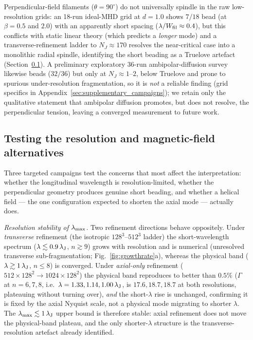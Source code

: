 \documentclass[usenatbib,twoside,twocolumn]{mnras}
\begin{document}
Perpendicular-field filaments ($\theta=90^\circ$) do not universally spindle in the raw low-resolution grids: an 18-run ideal-MHD grid at $d=1.0$ shows $7/18$ bead (at $\beta=0.5$ and $2.0$) with an apparently short spacing ($\lambda/W_{\rm fil}\approx0.4$), but this conflicts with static linear theory (which predicts a \emph{longer} mode) and a transverse-refinement ladder to $N_J\approx170$ resolves the near-critical case into a monolithic radial spindle, identifying the short beading as a Truelove artefact (Section~\ref{sec:optional_tests}). A preliminary exploratory 36-run ambipolar-diffusion survey likewise beads ($32/36$) but only at $N_J\approx1$--$2$, below Truelove and prone to spurious under-resolution fragmentation, so it is \emph{not} a reliable finding (grid specifics in Appendix~\ref{sec:supplementary_campaigns}); we retain only the qualitative statement that ambipolar diffusion promotes, but does not resolve, the perpendicular tension, leaving a converged measurement to future work.

\subsection{Testing the resolution and magnetic-field alternatives}
\label{sec:optional_tests}
Three targeted campaigns test the concerns that most affect the interpretation: whether the longitudinal wavelength is resolution-limited, whether the perpendicular geometry produces genuine short beading, and whether a helical field --- the one configuration expected to shorten the axial mode --- actually does.

\emph{Resolution stability of $\lambda_{\rm max}$.} Two refinement directions behave oppositely. Under \emph{transverse} refinement (the isotropic $128^3$--$512^3$ ladder) the short-wavelength spectrum ($\lambda\lesssim0.9\,\lambda_{\rm J}$, $n\gtrsim9$) grows with resolution and is numerical (unresolved transverse sub-fragmentation; Fig.~\ref{fig:growthrate}a), whereas the physical band ($\lambda\gtrsim1\,\lambda_{\rm J}$, $n\leq8$) is converged. Under \emph{axial-only} refinement ($512\times128^2\to1024\times128^2$) the physical band reproduces to better than $0.5\%$ ($\Gamma$ at $n=6,7,8$, i.e.\ $\lambda=1.33,1.14,1.00\,\lambda_{\rm J}$, is $17.6,18.7,18.7$ at both resolutions, plateauing without turning over), \emph{and} the short-$\lambda$ rise is unchanged, confirming it is fixed by the axial Nyquist scale, not a physical mode migrating to shorter $\lambda$. The $\lambda_{\rm max}\lesssim1\,\lambda_{\rm J}$ upper bound is therefore stable: axial refinement does not move the physical-band plateau, and the only shorter-$\lambda$ structure is the transverse-resolution artefact already identified.
\end{document}
